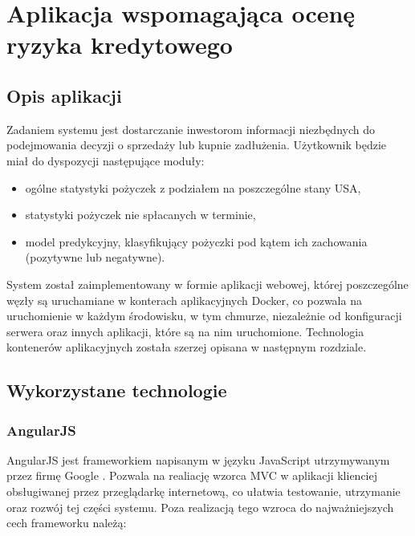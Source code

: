 \chapter{Aplikacja wspomagająca ocenę ryzyka kredytowego}

\section{Opis aplikacji}

Zadaniem systemu jest dostarczanie inwestorom informacji niezbędnych do podejmowania decyzji o sprzedaży lub kupnie zadłużenia. Użytkownik będzie miał do dyspozycji następujące moduły:

\begin{itemize}
	\item ogólne statystyki pożyczek z podziałem na poszczególne stany USA,
	\item statystyki pożyczek nie spłacanych w terminie,
	\item model predykcyjny, klasyfikujący pożyczki pod kątem ich zachowania (pozytywne lub negatywne).
\end{itemize}

System został zaimplementowany w formie aplikacji webowej, której poszczególne węzły są uruchamiane w konterach aplikacyjnych Docker, co pozwala na uruchomienie w każdym środowisku, w tym chmurze, niezależnie od konfiguracji serwera oraz innych aplikacji, które są na nim uruchomione. Technologia kontenerów aplikacyjnych została szerzej opisana w następnym rozdziale. 

\section{Wykorzystane technologie}

\subsection{AngularJS}

AngularJS jest frameworkiem napisanym w języku JavaScript utrzymywanym przez firmę Google \cite{angular}. Pozwala na realiację wzorca MVC w aplikacji klienciej obsługiwanej przez przeglądarkę internetową, co ułatwia testowanie, utrzymanie oraz rozwój tej części systemu.  Poza realizacją tego wzroca do najważniejszych cech frameworku należą:

